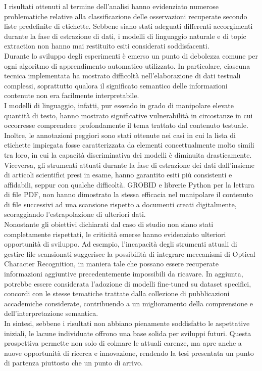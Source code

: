 I risultati ottenuti al termine dell'analisi hanno evidenziato numerose problematiche relative alla classificazione delle osservazioni recuperate secondo liste predefinite di etichette. Sebbene siano stati adeguati differenti accorgimenti durante la fase di estrazione di dati, i modelli di linguaggio naturale e di topic extraction non hanno mai restituito esiti considerati soddisfacenti. \vspace{7pt} \\
Durante lo sviluppo degli esperimenti è emerso un punto di debolezza comune per ogni algoritmo di apprendimento automatico utilizzato. In particolare, ciascuna tecnica implementata ha mostrato difficoltà nell'elaborazione di dati testuali complessi, soprattutto qualora il significato semantico delle informazioni contenute non era facilmente interpretabile. \vspace{7pt} \\
I modelli di linguaggio, infatti, pur essendo in grado di manipolare elevate quantità di testo, hanno mostrato significative vulnerabilità in circostanze in cui occorresse comprendere profondamente il tema trattato dal contenuto testuale. Inoltre, le annotazioni peggiori sono stati ottenute nei casi in cui la lista di etichette impiegata fosse caratterizzata da elementi concettualmente molto simili tra loro, in cui la capacità discriminativa dei modelli è diminuita drasticamente. \vspace{7pt} \\
Viceversa, gli strumenti attuati durante la fase di estrazione dei dati dall'insieme di articoli scientifici presi in esame, hanno garantito esiti più consistenti e affidabili, seppur con qualche difficoltà. GROBID e librerie Python per la lettura di file PDF, non hanno dimostrato la stessa efficacia nel manipolare il contenuto di file successivi ad una scansione rispetto a documenti creati digitalmente, scoraggiando l'estrapolazione di ulteriori dati. \vspace{7pt} \\
Nonostante gli obiettivi dichiarati dal caso di studio non siano stati completamente rispettati, le criticità emerse hanno evidenziato ulteriori opportunità di sviluppo. Ad esempio, l'incapacità degli strumenti attuali di gestire file scansionati suggerisce la possibilità di integrare meccanismi di Optical Character Recognition, in maniera tale che possano essere recuperate informazioni aggiuntive precedentemente impossibili da ricavare. In aggiunta, potrebbe essere considerata l'adozione di modelli fine-tuned su dataset specifici, concordi con le stesse tematiche trattate dalla collezione di pubblicazioni accademiche considerate, contribuendo a un miglioramento della comprensione e dell'interpretazione semantica. \vspace{7pt} \\
In sintesi, sebbene i risultati non abbiano pienamente soddisfatto le aspettative iniziali, le lacune individuate offrono una base solida per sviluppi futuri. Questa prospettiva permette non solo di colmare le attuali carenze, ma apre anche a nuove opportunità di ricerca e innovazione, rendendo la tesi presentata un punto di partenza piuttosto che un punto di arrivo.